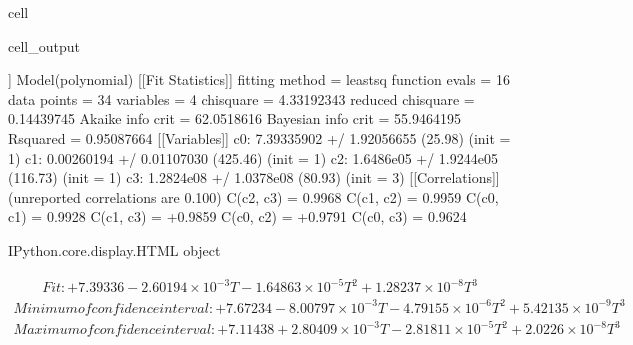 \documentclass[letterpaper,10pt,english]{jupyterBook}
\begin{document}
\begin{sphinxuseclass}{cell}
\begin{sphinxVerbatimOutput}
\begin{sphinxuseclass}{cell_output}
				\begin{sphinxVerbatim}[commandchars=\\\{\}]
					[[Model]]
					Model(polynomial)
					[[Fit Statistics]]
					\PYGZsh{} fitting method   = leastsq
					\PYGZsh{} function evals   = 16
					\PYGZsh{} data points      = 34
					\PYGZsh{} variables        = 4
					chi\PYGZhy{}square         = 4.33192343
					reduced chi\PYGZhy{}square = 0.14439745
					Akaike info crit   = \PYGZhy{}62.0518616
					Bayesian info crit = \PYGZhy{}55.9464195
					R\PYGZhy{}squared          = 0.95087664
					[[Variables]]
					c0:  7.39335902 +/\PYGZhy{} 1.92056655 (25.98\PYGZpc{}) (init = 1)
					c1: \PYGZhy{}0.00260194 +/\PYGZhy{} 0.01107030 (425.46\PYGZpc{}) (init = 1)
					c2: \PYGZhy{}1.6486e\PYGZhy{}05 +/\PYGZhy{} 1.9244e\PYGZhy{}05 (116.73\PYGZpc{}) (init = 1)
					c3:  1.2824e\PYGZhy{}08 +/\PYGZhy{} 1.0378e\PYGZhy{}08 (80.93\PYGZpc{}) (init = 3)
					[[Correlations]] (unreported correlations are \PYGZlt{} 0.100)
					C(c2, c3) = \PYGZhy{}0.9968
					C(c1, c2) = \PYGZhy{}0.9959
					C(c0, c1) = \PYGZhy{}0.9928
					C(c1, c3) = +0.9859
					C(c0, c2) = +0.9791
					C(c0, c3) = \PYGZhy{}0.9624
				\end{sphinxVerbatim}
				
				\begin{sphinxVerbatim}[commandchars=\\\{\}]
					\PYGZlt{}IPython.core.display.HTML object\PYGZgt{}
				\end{sphinxVerbatim}
				
				\sphinxAtStartPar
				\begin{equation*}
					\begin{split}Fit: \boxed{ + 7.39336 - 2.60194 \times 10^{-3} T - 1.64863 \times 10^{-5} T^{2} + 1.28237 \times 10^{-8} T^{3}  }\end{split}
				\end{equation*}\begin{equation*}
					\begin{split}Minimum of confidence interval: \boxed{ + 7.67234 - 8.00797 \times 10^{-3} T - 4.79155 \times 10^{-6} T^{2} + 5.42135 \times 10^{-9} T^{3}  }\end{split}
				\end{equation*}\begin{equation*}
					\begin{split}Maximum of confidence interval: \boxed{ + 7.11438 + 2.80409 \times 10^{-3} T - 2.81811 \times 10^{-5} T^{2} + 2.0226 \times 10^{-8} T^{3}  }\end{split}
				\end{equation*}
				\noindent{}
				
		\end{sphinxuseclass}\end{sphinxVerbatimOutput}
		
	\end{sphinxuseclass}
\end{document}
